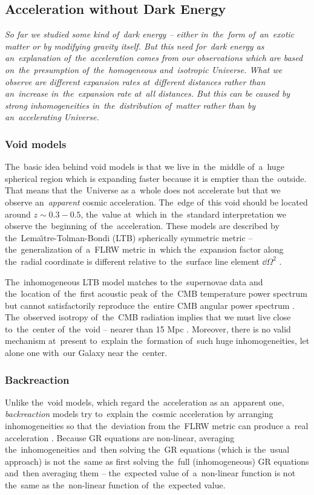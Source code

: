 \subsection{Acceleration without Dark Energy}
{\itshape
So far we studied some kind of~dark energy -- either in~the~form of~an~exotic matter or by modifying gravity itself. But this need for~dark energy as an~explanation of~the~acceleration comes from our observations which are based on~the~presumption of~the~homogeneous and~isotropic Universe. What we observe are different expansion rates at~different distances rather than an~increase in~the~expansion rate at~all distances. But this can be caused by strong inhomogeneities in~the~distribution of~matter rather than by an~accelerating Universe.
\subsubsection{Void models}
The~basic idea behind void models is that we live in~the~middle of~a~huge spherical region which is expanding faster because it is emptier than the~outside. That means that the~Universe as a~whole does not accelerate but that we observe an~\textit{apparent} cosmic acceleration. The~edge of~this void should be located around $z\sim0.3-0.5$, the~value at~which in~the~standard interpretation we observe the~beginning of~the~acceleration. These models are described by the~Lema\^\i tre-Tolman-Bondi (LTB) spherically symmetric metric -- the~generalization of~a~FLRW metric in~which the~expansion factor along the~radial coordinate is different relative to~the~surface line element $\dd\Omega^2$ \parencite{2013JCAP...02..047D,2006PhRvD..73h3519A}.

The~inhomogeneous LTB model matches to the~supernovae data and the~location of~the~first acoustic peak of~the~CMB temperature power spectrum but cannot satisfactorily reproduce the~entire CMB angular power spectrum \parencite{2011JCAP...02..013C}. The~observed isotropy of~the~CMB radiation implies that we must live close to~the~center of~the~void -- nearer than 15 Mpc \parencite{2006PhRvD..74j3520A}. Moreover, there is no valid mechanism at~present to~explain the~formation of~such huge inhomogeneities, let alone one with~our Galaxy near the~center.
\subsubsection{Backreaction}
Unlike the~void models, which regard the~acceleration as an~apparent one, \textit{backreaction} models try to~explain the~cosmic acceleration by arranging inhomogeneities so that the~deviation from the~FLRW metric can produce a~real acceleration \parencite{2011CQGra..28w5002S,2004JCAP...02..003R,2005PhRvD..72b3507M}. Because GR equations are non-linear, averaging the~inhomogeneities and~then solving the~GR equations (which is the~usual approach) is not the~same as first solving the~full (inhomogeneous) GR equations and~then averaging them -- the~expected value of~a~non-linear function is not the~same as the~non-linear function of~the~expected value.

}
